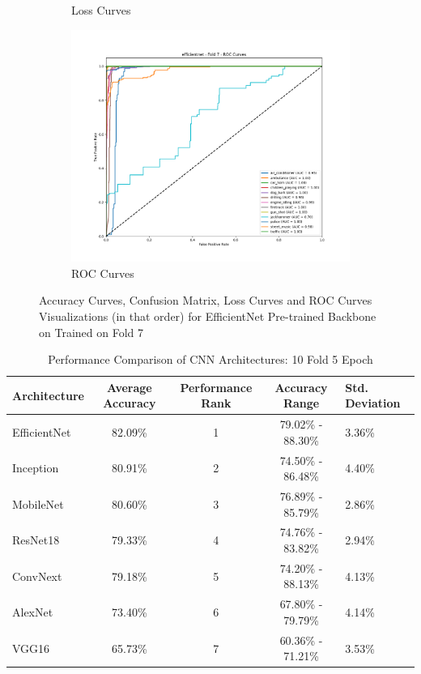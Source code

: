 \documentclass[11pt]{article}
\begin{document}
\begin{figure}[ht]
\begin{subfigure}[b]{0.24\textwidth}
        \caption{Loss Curves}
    \end{subfigure}
    \hfill
    \begin{subfigure}[b]{0.24\textwidth}
        \centering
        \includegraphics[width=\textwidth]{latex/assets/efficientnet_pretrained_fold7/roc_curves.png}
        \caption{ROC Curves}
    \end{subfigure}
    \caption{Accuracy Curves, Confusion Matrix, Loss Curves and ROC Curves Visualizations (in that order) for EfficientNet Pre-trained Backbone on Trained on Fold 7}
\end{figure}
\begin{table}[ht]
    \centering
    \begin{tabular}{|l|c|c|c|l|} \hline  
         \textbf{Architecture}& \textbf{Average Accuracy}& \textbf{Performance Rank}&\textbf{Accuracy Range} &\textbf{Std. Deviation}\\ \hline  
         
         EfficientNet& 82.09\%& 1&79.02\% - 88.30\%&3.36\%\\ \hline  
         Inception& 80.91\%& 2&74.50\% - 86.48\%&4.40\%\\ \hline  
         MobileNet& 80.60\%& 3&76.89\% - 85.79\%&2.86\%\\ \hline
         ResNet18& 79.33\%& 4&74.76\% - 83.82\%&2.94\%\\\hline
         ConvNext& 79.18\%& 5&74.20\% - 88.13\%&4.13\%\\\hline
         AlexNet& 73.40\%& 6&67.80\% - 79.79\%&4.14\%\\\hline
         VGG16& 65.73\%& 7&60.36\% - 71.21\%&3.53\%\\\hline  
    \end{tabular}
    \caption{Performance Comparison of CNN Architectures: 10 Fold 5 Epoch} 
\end{table}
\end{document}
